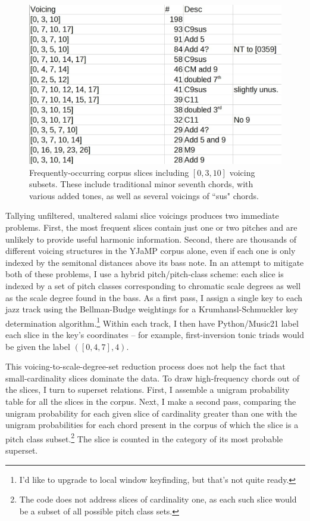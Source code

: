 \begin{figure}[h!]
	\centering
	\includegraphics[width=5in]{0310_tones.jpg}
	\caption{Frequently-occurring corpus slices including $[0,3,10]$ voicing subsets.  These include traditional minor seventh chords, with various added tones, as well as several voicings of ``sus" chords.}
	\label{[0,3,10]}
\end{figure}
\newpage


Tallying unfiltered, unaltered salami slice voicings produces two immediate problems.  First, the most frequent slices contain just one or two pitches and are unlikely to provide useful harmonic information.  Second, there are thousands of different voicing structures in the YJaMP corpus alone, even if each one is only indexed by the semitonal distances above its bass note.  In an attempt to mitigate both of these problems, I use a hybrid pitch/pitch-class scheme: each slice is indexed by a set of pitch classes corresponding to chromatic scale degrees as well as the scale degree found in the bass.  As a first pass, I assign a single key to each jazz track using the Bellman-Budge weightings for a Krumhansl-Schmuckler key determination algorithm.\footnote{I'd like to upgrade to local window keyfinding, but that's not quite ready.}  Within each track, I then have Python/Music21 label each slice in the key's coordinates -- for example, first-inversion tonic triads would be given the label $([0,4,7],4)$.  

This voicing-to-scale-degree-set reduction process does not help the fact that small-cardinality slices dominate the data.  To draw high-frequency chords out of the slices, I turn to superset relations.  First, I assemble a unigram probability table for all the slices in the corpus.  Next, I make a second pass, comparing the unigram probability for each given slice of cardinality greater than one with the unigram probabilities for each chord present in the corpus of which the slice is a pitch class subset.\footnote{The code does not address slices of cardinality one, as each such slice would be a subset of all possible pitch class sets.}  The slice is counted in the category of its most probable superset.

